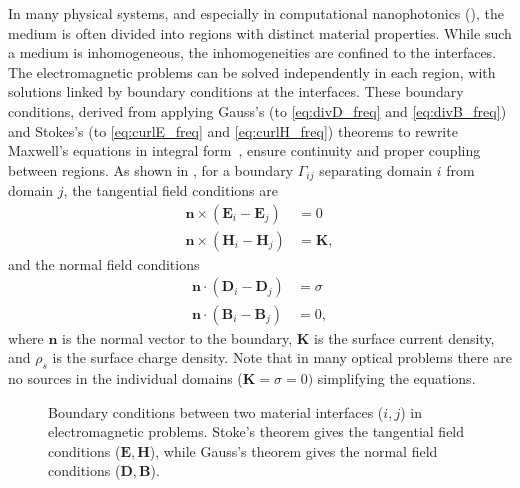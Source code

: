     In many physical systems, and especially in computational nanophotonics
    (), the medium is often divided into regions with distinct
    material properties. While such a medium is inhomogeneous, the inhomogeneities
    are confined to the interfaces. The electromagnetic problems can be solved
    independently in each region, with solutions linked by boundary conditions at
    the interfaces. These boundary conditions, derived from applying Gauss's (to \eqref{eq:divD_freq} and \eqref{eq:divB_freq}) and
    Stokes's (to \eqref{eq:curlE_freq} and \eqref{eq:curlH_freq}) theorems to rewrite Maxwell's equations in integral form~\cite{novotny}, ensure continuity
    and proper coupling between regions.
    As shown in , for a boundary $\Gamma_{ij}$ separating domain
$i$ from domain $j$, the tangential field conditions are~\cite{novotny}
    \begin{align}
        \mathbf{n} \times (\mathbf{E}_i - \mathbf{E}_j) & = 0 \label{eq:BC_E} \\
        \mathbf{n} \times (\mathbf{H}_i - \mathbf{H}_j) & = \mathbf{K} ,
        \label{eq:BC_H}
    \end{align}
    and the normal field conditions
    \begin{align}
        \mathbf{n} \cdot (\mathbf{D}_i - \mathbf{D}_j) & = \sigma \label{eq:BC_D} \\
        \mathbf{n} \cdot (\mathbf{B}_i - \mathbf{B}_j) & = 0, \label{eq:BC_B}
    \end{align}
    where $\mathbf{n}$ is the normal vector to the boundary, $\mathbf{K}$ is the
    surface current density,
    and $\rho_s$ is the surface charge density. Note that in many optical problems
    there are no
    sources in the individual domains ($\mathbf{K}=\sigma=0)$ simplifying the
    equations.

    \begin{figure}[tb]
        \centering

        \caption{Boundary conditions between two material interfaces ($i,j$) in electromagnetic problems. Stoke's theorem gives the tangential field
        conditions ($\mathbf{E}, \mathbf{H}$), while Gauss's theorem gives the normal field conditions ($\mathbf{D}, \mathbf{B}$).}
        \label{fig:bcs}
    \end{figure}

